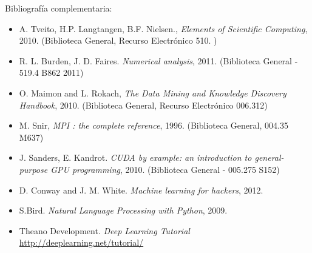 \documentclass[letterpaper,10pt,onecolumn]{article}
\begin{document}
\noindent\normalsize Bibliograf\'ia complementaria:

\begin{itemize}
\item A. Tveito, H.P. Langtangen, B.F. Nielsen., \textit{Elements of
  Scientific Computing}, 2010.  (Biblioteca General, Recurso
  Electr\'onico 510. )\\[-0.6cm] 
\item R. L. Burden, J. D. Faires. \textit{Numerical analysis},
  2011. (Biblioteca General - 519.4 B862 2011)\\[-0.6cm]
\item O. Maimon and L. Rokach, \textit{The Data Mining and Knowledge
  Discovery Handbook}, 2010. (Biblioteca General, Recurso
  Electr\'onico 006.312)\\[-0.6cm]
\item M. Snir, \textit{MPI : the complete reference},
  1996. (Biblioteca General, 004.35 M637)\\[-0.6cm]
\item J. Sanders, E. Kandrot. \textit{CUDA by example: an
  introduction to general-purpose GPU programming}, 2010. (Biblioteca
  General - 005.275 S152)\\[-0.6cm]
\item D. Conway and J. M. White. \textit{Machine learning for
    hackers}, 2012.\\[-0.6cm]
\item S.Bird. \textit{Natural Language Processing with
  Python}, 2009.\\[-0.6cm]
\item Theano Development. \textit{Deep Learning Tutorial}
  \url{http://deeplearning.net/tutorial/}  \\[-0.2cm]
\end{itemize}
\end{document}
